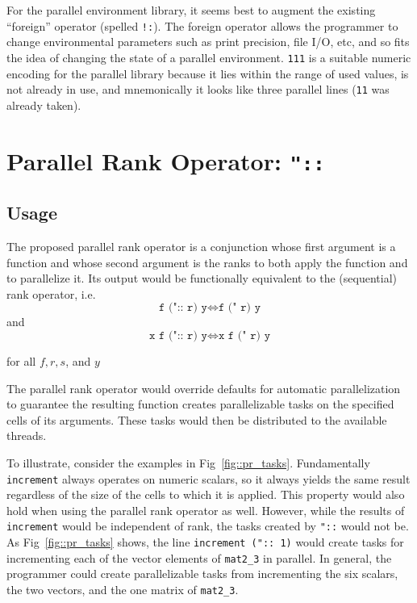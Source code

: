 For the parallel environment library, 
it seems best to augment the existing ``\gls{foreign}'' operator (spelled \texttt{!:}).  
The foreign operator allows
the programmer to change environmental parameters 
such as print precision, file I/O, etc\cite{jvocab}, 
and so fits the idea of changing the state of a parallel environment. 
\texttt{111} is a suitable numeric encoding for the parallel library because 
it lies within the range of used values, is not already in use, and 
mnemonically it looks like three parallel lines (\texttt{11} was already taken)\cite{jvocab}.

\section{Parallel Rank Operator: \texttt{"::}}
\label{prank}

\subsection{Usage}
The proposed parallel rank operator is a conjunction 
whose first argument is a function 
and whose second argument is the ranks to both apply the function and to parallelize it. 
Its output would be functionally equivalent to the (sequential) rank operator, i.e. 
\[\texttt{f (":: r) y} \Leftrightarrow \texttt{f (" r) y}\] and
\[\texttt{x f (":: r) y} \Leftrightarrow \texttt{x f (" r) y}\]

for all $f, r, s$, and $y$

\noindent The parallel rank operator would 
override defaults for automatic parallelization 
to guarantee the resulting function creates parallelizable tasks 
on the specified cells of its arguments.
These tasks would then be distributed to the available threads.

To illustrate, consider the examples in Fig~\ref{fig::pr_tasks}. 
Fundamentally \texttt{increment} always operates on numeric scalars, 
so it always yields the same result regardless of the size of the cells to which it is applied. 
This property would also hold when using the parallel rank operator as well. 
However, while the results of \texttt{increment} would be independent of rank, 
the tasks created by \texttt{"::} would not be.
As Fig~\ref{fig::pr_tasks} shows, 
the line \texttt{increment (":: 1)} would create tasks 
for incrementing each of the vector elements of \texttt{mat2\_3} in parallel.
In general, the programmer could create parallelizable tasks from incrementing
the six scalars, the two vectors, and the one matrix of \texttt{mat2\_3}.

